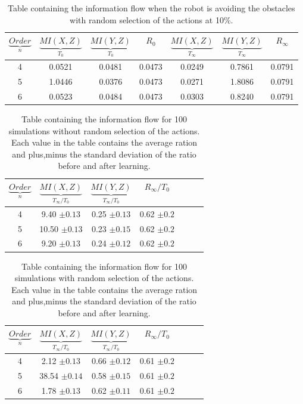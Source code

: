 \begin{table}[htbp]
\addtolength{\tabcolsep}{-2pt}
\centering
\begin{tabular}{| c|| c | c | c | c| c | c |}
\hline
$\underbrace{Order}_ n$& $\underbrace{MI(X,Z)}_{T_0}$& $\underbrace{MI(Y,Z)}_{T_0}$ & $R_0$ & $\underbrace{MI(X,Z)}_{T_\infty}$& $\underbrace{MI(Y,Z)}_{T_\infty}$ & $R_\infty$ \\
\hline
4 & 0.0521 & 0.0481 & 0.0473 & 0.0249 & 0.7861 & 0.0791 \\
\hline
5 & 1.0446 & 0.0376 & 0.0473 & 0.0271 & 1.8086 & 0.0791 \\
\hline
6 & 0.0523 & 0.0484 & 0.0473 & 0.0303 & 0.8240 & 0.0791 \\
\hline
\end{tabular}
\caption[Information flow for avoidance robot]{Table containing the information flow when
the robot is avoiding the obstacles with random selection of the actions at 10\%. \label{tab:Qlearning:infoflowtable-wrandom}}
\end{table}

\begin{table}[htbp]
\addtolength{\tabcolsep}{-2pt}
\centering
\begin{tabular}{| c|| c| c | c| c | c | c |}
\hline
$\underbrace{Order}_ n$& $\underbrace{MI(X,Z)}_{T_\infty / T_0}$& $\underbrace{MI(Y,Z)}_{T_\infty / T_0}$ & $R_{\infty}/ T_0$ \\
\hline
4 & 9.40 $\pm 0.13$& 0.25 $\pm 0.13$ & 0.62 $\pm 0.2$\\
\hline
5 & 10.50 $\pm 0.13$& 0.23 $\pm 0.15$ & 0.62 $\pm 0.2$\\
\hline
6 & 9.20 $\pm 0.13$& 0.24 $\pm 0.12$ & 0.62 $\pm 0.2$\\
\hline
\end{tabular}
\caption[Information flow ratios]{Table containing the information flow for 100 simulations
 without random selection of the actions. 
Each value in the table contains the average ration and plus,minus the standard deviation of
the ratio before and after learning.
\label{tab:Qlearning:infoflowtable-worandom-stat}}
\end{table}

\begin{table}[htbp]
\addtolength{\tabcolsep}{-2pt}
\centering
\begin{tabular}{| c|| c| c | c| c | c | c |}
\hline
$\underbrace{Order}_ n$& $\underbrace{MI(X,Z)}_{T_\infty / T_0}$& $\underbrace{MI(Y,Z)}_{T_\infty / T_0}$ & $R_{\infty}/ T_0$ \\
\hline
4 & 2.12 $\pm 0.13$& 0.66 $\pm 0.12$ & 0.61 $\pm 0.2$\\
\hline
5 & 38.54 $\pm 0.14$& 0.58 $\pm 0.15$ & 0.61 $\pm 0.2$\\
\hline
6 & 1.78 $\pm 0.13$& 0.62  $\pm 0.11$ & 0.61 $\pm 0.2$\\
\hline
\end{tabular}
\caption[Information flow ratios]{Table containing the information flow for 100 simulations
 with random selection of the actions. 
Each value in the table contains the average ration and plus,minus the standard deviation of
the ratio before and after learning.
\label{tab:Qlearning:infoflowtable-wrandom-stat}}
\end{table}

